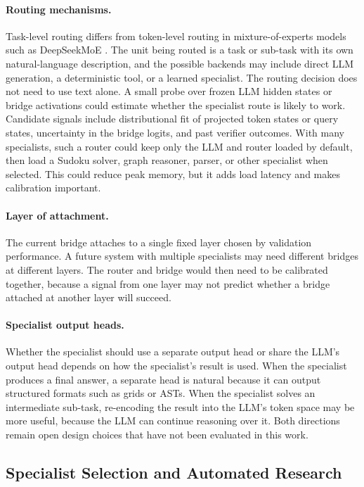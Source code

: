 \documentclass[11pt]{article}
\begin{document}
\paragraph{Routing mechanisms.}
Task-level routing differs from token-level routing in mixture-of-experts models such as DeepSeekMoE \cite{daiDeepSeekMoEUltimateExpert2024}.
The unit being routed is a task or sub-task with its own natural-language description, and the possible backends may include direct LLM generation, a deterministic tool, or a learned specialist.
The routing decision does not need to use text alone.
A small probe over frozen LLM hidden states or bridge activations could estimate whether the specialist route is likely to work.
Candidate signals include distributional fit of projected token states or query states, uncertainty in the bridge logits, and past verifier outcomes.
With many specialists, such a router could keep only the LLM and router loaded by default, then load a Sudoku solver, graph reasoner, parser, or other specialist when selected.
This could reduce peak memory, but it adds load latency and makes calibration important.

\paragraph{Layer of attachment.}
The current bridge attaches to a single fixed layer chosen by validation performance.
A future system with multiple specialists may need different bridges at different layers.
The router and bridge would then need to be calibrated together, because a signal from one layer may not predict whether a bridge attached at another layer will succeed.

\paragraph{Specialist output heads.}
Whether the specialist should use a separate output head or share the LLM's output head depends on how the specialist's result is used.
When the specialist produces a final answer, a separate head is natural because it can output structured formats such as grids or ASTs.
When the specialist solves an intermediate sub-task, re-encoding the result into the LLM's token space may be more useful, because the LLM can continue reasoning over it.
Both directions remain open design choices that have not been evaluated in this work.

\subsection{Specialist Selection and Automated Research}
\label{sec:auto_domain_future_work}
\end{document}
